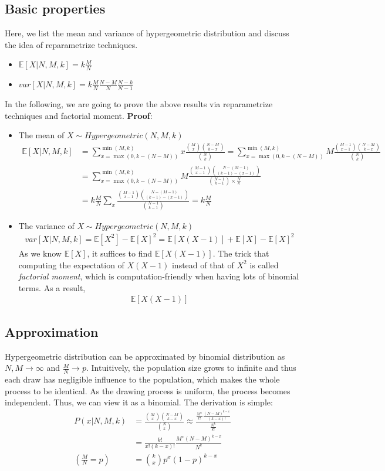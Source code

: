 \documentclass[11pt]{article}
\begin{document}
\subsection{Basic properties}
Here, we list the mean and variance of hypergeometric distribution and discuss the idea of reparametrize techniques.
\begin{itemize}
	\item $\mathbb{E}[X|N,M,k] = k\frac{M}{N}$
	\item $var[X|N,M,k]=k\frac{M}{N}\frac{N-M}{N}\frac{N-k}{N-1}$
\end{itemize}
In the following, we are going to prove the above results via reparametrize techniques and factorial moment.
{\bf Proof}:
\begin{itemize}
	\item The mean of $X\sim\textit{Hypergeometric}(N,M,k)$
	\begin{align*}
	\mathbb{E}[X|N,M,k] &= \sum_{x=\max(0,k-(N-M))}^{\min(M,k)} x \frac{{M\choose x}{N-M \choose k-x}}{{N\choose k}}= \sum_{x=\max(0,k-(N-M))}^{\min(M,k)} M \frac{{M-1\choose x-1}{N-M \choose k-x}}{{N\choose k}}\\
	&= \sum_{x=\max(0,k-(N-M))}^{\min(M,k)} M \frac{{M-1\choose x-1}{N-(M-1) \choose (k-1)-(x-1)}}{{N-1\choose k-1}\times\frac{N}{k}}\\
	&=k\frac{M}{N}\sum_{x}\frac{{M-1\choose x-1}{N-(M-1) \choose (k-1)-(x-1)}}{{N-1\choose k-1}}=k\frac{M}{N}
	\end{align*}
	\item The variance of $X\sim\textit{Hypergeometric}(N,M,k)$
	\begin{align*}
	var[X|N,M,k] = \mathbb{E}[X^2]-\mathbb{E}[X]^2 = \mathbb{E}[X(X-1)] + \mathbb{E}[X] - \mathbb{E}[X]^2
	\end{align*}
	As we know $\mathbb{E}[X]$, it suffices to find $\mathbb{E}[X(X-1)]$. The trick that computing the expectation of $X(X-1)$ instead of that of $X^2$ is called {\it factorial moment}, which is computation-friendly when having lots of binomial terms. As a result,
	\begin{align*}
	\mathbb{E}[X(X-1)] 
	\end{align*}
\end{itemize}

\subsection{Approximation}
Hypergeometric distribution can be approximated by binomial distribution as $N,M\rightarrow\infty$ and $\frac{M}{N}\rightarrow p$. Intuitively, the population size grows to infinite and thus each draw has negligible influence to the population, which makes the whole process to be identical. As the drawing process is uniform, the process becomes independent. Thus, we can view it as a binomial. The derivation is simple:
\begin{align*}
P(x|N,M,k) &= \frac{{M\choose x}{N-M \choose k-x}}{{N\choose k}} \approx \frac{\frac{M^x}{x!}\frac{(N-M)^{k-x}}{(k-x)!}}{\frac{N^k}{k!}}\\
&=\frac{k!}{x!(k-x)!}\frac{M^x(N-M)^{k-x}}{N^k}\\
(\frac{M}{N}=p)&={k\choose x}p^x(1-p)^{k-x}
\end{align*}
\end{document}
